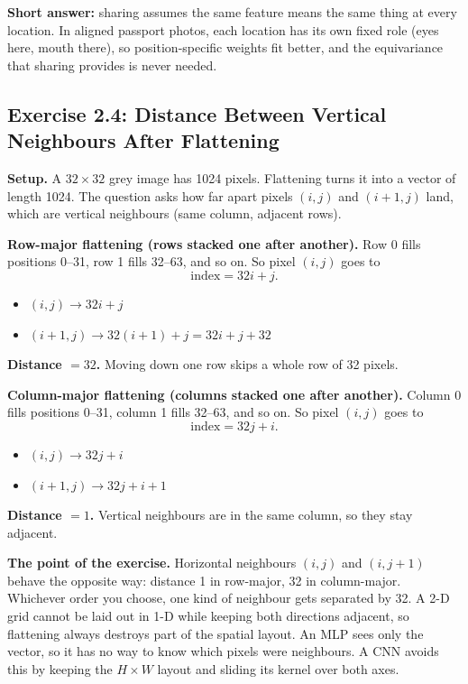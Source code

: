 \textbf{Short answer:} sharing assumes the same feature means the same thing at every location. In aligned passport photos, each location has its own fixed role (eyes here, mouth there), so position-specific weights fit better, and the equivariance that sharing provides is never needed.

\subsection*{Exercise 2.4: Distance Between Vertical Neighbours After Flattening}

\textbf{Setup.} A $32\times32$ grey image has 1024 pixels. Flattening turns it into a vector of length 1024. The question asks how far apart pixels $(i,j)$ and $(i+1,j)$ land, which are vertical neighbours (same column, adjacent rows).

\textbf{Row-major flattening (rows stacked one after another).} Row 0 fills positions 0--31, row 1 fills 32--63, and so on. So pixel $(i,j)$ goes to
\[
\text{index} = 32i + j.
\]
\begin{itemize}[leftmargin=*]
  \item $(i,j) \to 32i + j$
  \item $(i+1,j) \to 32(i+1) + j = 32i + j + 32$
\end{itemize}
\textbf{Distance $= 32$.} Moving down one row skips a whole row of 32 pixels.

\textbf{Column-major flattening (columns stacked one after another).} Column 0 fills positions 0--31, column 1 fills 32--63, and so on. So pixel $(i,j)$ goes to
\[
\text{index} = 32j + i.
\]
\begin{itemize}[leftmargin=*]
  \item $(i,j) \to 32j + i$
  \item $(i+1,j) \to 32j + i + 1$
\end{itemize}
\textbf{Distance $= 1$.} Vertical neighbours are in the same column, so they stay adjacent.

\textbf{The point of the exercise.} Horizontal neighbours $(i,j)$ and $(i,j+1)$ behave the opposite way: distance 1 in row-major, 32 in column-major. Whichever order you choose, one kind of neighbour gets separated by 32. A 2-D grid cannot be laid out in 1-D while keeping both directions adjacent, so flattening always destroys part of the spatial layout. An MLP sees only the vector, so it has no way to know which pixels were neighbours. A CNN avoids this by keeping the $H\times W$ layout and sliding its kernel over both axes.